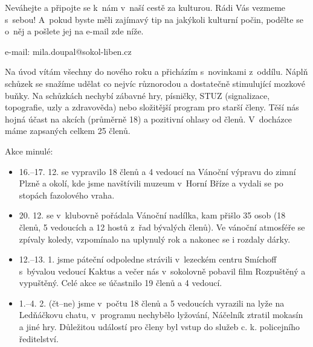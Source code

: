 \documentclass[11pt]{article}
\begin{document}
Neváhejte a připojte se k~nám v~naší cestě za kulturou. Rádi Vás vezmeme s~sebou! A~pokud byste měli zajímavý tip na jakýkoli kulturní počin, podělte se o~něj a pošlete jej na e-mail zde níže.

\signature{Miloslav Doupal}{e-mail: mila.doupal@sokol-liben.cz}


\vspace*{24pt}

Na úvod vítám všechny do nového roku a přicházím s~novinkami z~oddílu. Náplň schůzek se snažíme udělat co nejvíc různorodou a dostatečně stimulující mozkové buňky. Na schůzkách nechybí zábavné hry, písničky, STUZ (signalizace, topografie, uzly a zdravověda) nebo složitější program pro starší členy. Těší nás hojná účast na akcích (průměrně 18) a pozitivní ohlasy od členů. V~docházce máme zapsaných celkem 25 členů.

\vspace*{12pt}\noindent
Akce minulé:
\begin{itemize}[
  itemsep=-3pt,
  leftmargin=2em,
  itemindent=-1em
]
  \item[] 16.–17. 12. se vypravilo 18 členů a 4 vedoucí na Vánoční výpravu do zimní Plzně a okolí, kde jsme navštívili muzeum v~Horní Bříze a vydali se po stopách fazolového vraha.
  \item[] 20. 12. se v~klubovně pořádala Vánoční nadílka, kam přišlo 35 osob (18 členů, 5 vedoucích a 12 hostů z~řad bývalých členů). Ve vánoční atmosféře se zpívaly koledy, vzpomínalo na uplynulý rok a nakonec se i rozdaly dárky.
  \item[] 12.–13. 1. jsme páteční odpoledne strávili v~lezeckém centru Smíchoff s~bývalou vedoucí Kaktus a večer nás v~sokolovně pobavil film Rozpuštěný a vypuštěný. Celé akce se účastnilo 19 členů a 4 vedoucí.
  \item[] 1.–4. 2. (čt–ne) jsme v~počtu 18 členů a 5 vedoucích vyrazili na lyže na Ledňáčkovu chatu, v~programu nechybělo lyžování, Náčelník ztratil mokasín a jiné hry. Důležitou událostí pro členy byl vstup do služeb c. k. policejního ředitelství.
\end{itemize}
\end{document}
